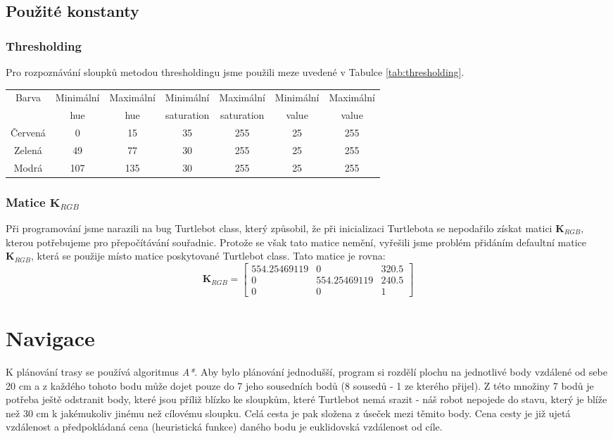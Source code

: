 \documentclass{article}
\begin{document}
\subsection{Použité konstanty}
\subsubsection{Thresholding}
Pro rozpoznávání sloupků metodou thresholdingu jsme použili meze uvedené v Tabulce \ref{tab:thresholding}.
\begin{center}
 \label{tab:thresholding} 
 \begin{tabular}{|c | c | c | c| c|c|c |}
 \hline
Barva & Minimální & Maximální & Minimální & Maximální & Minimální & Maximální \\
 & hue & hue & saturation & saturation & value & value\\
\hline
Červená & 0 & 15 & 35 & 255 & 25 & 255\\
\hline
Zelená & 49 & 77 & 30 & 255 & 25 & 255\\
\hline
Modrá & 107 & 135 & 30 & 255 & 25 & 255\\
\hline
\end{tabular}
\end{center}
\subsubsection{Matice \texorpdfstring{$\mathbf{K}_{RGB}$}{KRGB}}
Při programování jsme narazili na bug Turtlebot class, který způsobil, že při inicializaci Turtlebota se nepodařilo získat matici $\mathbf{K}_{RGB}$, kterou potřebujeme pro přepočítávání souřadnic. Protože se však tato matice nemění, vyřešili jsme problém přidáním defaultní matice  $\mathbf{K}_{RGB}$, která se použije místo matice poskytované Turtlebot class. Tato matice je rovna:
$$
\mathbf{K}_{RGB} = 
\begin{bmatrix}
554.25469119 & 0 & 320.5 \\
0 & 554.25469119 & 240.5 \\
0 & 0 & 1
\end{bmatrix}
$$
\section{Navigace}
K plánování trasy se používá algoritmus \textit{A*}. Aby bylo plánování jednodušší, program si rozdělí plochu na jednotlivé body vzdálené od sebe 20 cm a z každého tohoto bodu může dojet pouze do 7 jeho sousedních bodů (8 sousedů - 1 ze kterého přijel). Z této množiny 7 bodů je potřeba ještě odstranit body, které jsou příliž blízko ke sloupkům, které Turtlebot nemá srazit - náš robot nepojede do stavu, který je blíže než 30 cm k jakémukoliv jinému než cílovému sloupku. Celá cesta je pak složena z úseček mezi těmito body. Cena cesty je již ujetá vzdálenost a předpokládaná cena (heuristická funkce) daného bodu je euklidovská vzdálenost od cíle.
\end{document}
